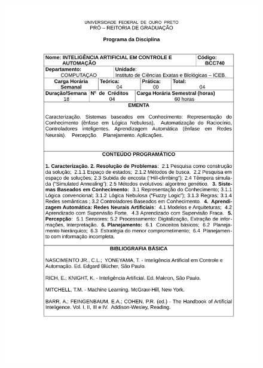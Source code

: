 \begin{figure}[p]
	\centering 
	\includegraphics[scale=0.7]{capitulos/anexo1-programas-disciplina/p91.pdf}
\end{figure}

